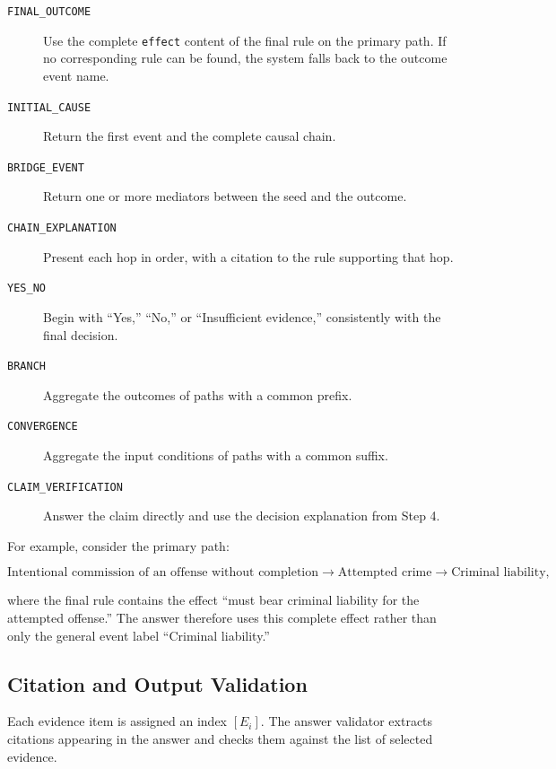 \begin{description}
    \item[\texttt{FINAL\_OUTCOME}] Use the complete \texttt{effect} content
    of the final rule on the primary path. If no corresponding rule can be
    found, the system falls back to the outcome event name.

    \item[\texttt{INITIAL\_CAUSE}] Return the first event and the complete
    causal chain.

    \item[\texttt{BRIDGE\_EVENT}] Return one or more mediators between the
    seed and the outcome.

    \item[\texttt{CHAIN\_EXPLANATION}] Present each hop in order, with a
    citation to the rule supporting that hop.

    \item[\texttt{YES\_NO}] Begin with ``Yes,'' ``No,'' or ``Insufficient
    evidence,'' consistently with the final decision.

    \item[\texttt{BRANCH}] Aggregate the outcomes of paths with a common
    prefix.

    \item[\texttt{CONVERGENCE}] Aggregate the input conditions of paths with
    a common suffix.

    \item[\texttt{CLAIM\_VERIFICATION}] Answer the claim directly and use
    the decision explanation from Step 4.
\end{description}

For example, consider the primary path:

\[
\text{Intentional commission of an offense without completion}
\rightarrow
\text{Attempted crime}
\rightarrow
\text{Criminal liability},
\]

where the final rule contains the effect ``must bear criminal liability for
the attempted offense.'' The answer therefore uses this complete effect
rather than only the general event label ``Criminal liability.''

\subsection{Citation and Output Validation}

Each evidence item is assigned an index \([E_i]\). The answer validator
extracts citations appearing in the answer and checks them against the list
of selected evidence.

